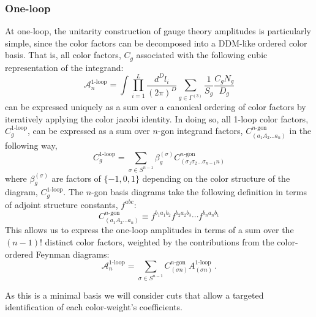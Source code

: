 \documentclass[12pt,letter]{article}
\begin{document}
\subsubsection{One-loop}\label{sec:1loopNLSM}
At one-loop, the unitarity construction of gauge theory amplitudes is particularly simple, since the color factors can be decomposed into a DDM-like ordered color basis. That is, all color factors, $C_g$ associated with the following cubic representation of the integrand:
\begin{equation}
\mathcal{A}^{1\text{-loop}}_{n} = \int \prod_{i=1}^L \frac{d^D l_i}{(2\pi)^D} \sum_{g\in \Gamma^{(3)}} \frac{1}{S_g}\frac{C_g N_g}{D_g}
\end{equation}
can be expressed uniquely as a sum over a canonical ordering of color factors by iteratively applying the color jacobi identity. In doing so, all 1-loop color factors, $C^{1\text{-loop}}_g$, can be expressed as a sum over $n$-gon integrand factors, $C^{n\text{-gon}}_{(a_1A_2...a_n)}$ in the following way,
\begin{equation}
C^{1\text{-loop}}_g = \sum_{\sigma\in S^{n-1}} \beta^{(\sigma)}_g C^{n\text{-gon}}_{(\sigma_{1}\sigma_{2}...\sigma_{n-1}n)} 
\end{equation}
where $\beta^{(\sigma)}_g$ are factors of $\{-1,0,1\}$ depending on the color structure of the diagram, $C^{1\text{-loop}}_g$. The $n$-gon basis diagrams take the following definition in terms of adjoint structure constants, $f^{abc}$:
\begin{equation}
C^{n\text{-gon}}_{(a_1A_2...a_n)} \equiv f^{b_1 a_1 b_2}f^{b_2 a_2 b_3}\cdots f^{b_{n} a_{n} b_1}
\end{equation}
This allows us to express the one-loop amplitudes in terms of a sum over the $(n-1)!$ distinct color factors, weighted by the contributions from the color-ordered Feynman diagrams:
\begin{equation}
\mathcal{A}^{1\text{-loop}}_n = \sum_{\sigma \in S^{n-1}} C^{n\text{-gon}}_{(\sigma n)} A^{1\text{-loop}}_{(\sigma n)}\,.
\end{equation}

As this is a minimal basis we will consider cuts that allow a targeted identification of each color-weight's coefficients.
\end{document}
